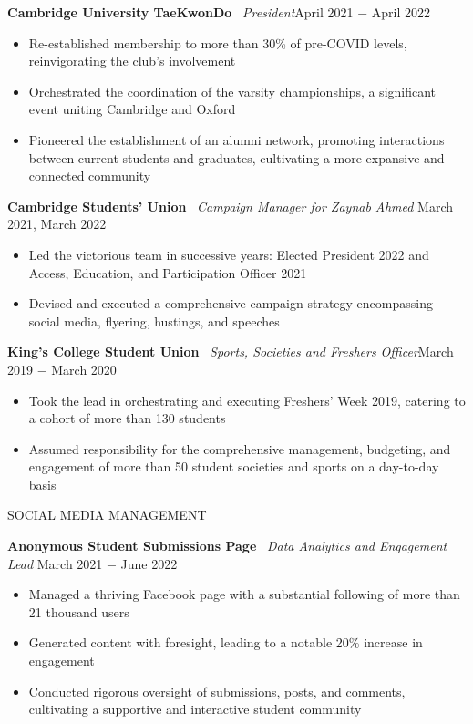 \documentclass{article}
\begin{document}
\textbf{Cambridge University TaeKwonDo} \
\textit{President}\hfill April 2021 $-$ April 2022
\begin{itemize}
    \item Re-established membership to more than 30\% of pre-COVID levels, reinvigorating the club's involvement
    \item Orchestrated the coordination of the varsity championships, a significant event uniting Cambridge and Oxford
    \item Pioneered the establishment of an alumni network, promoting interactions between current students and graduates, cultivating a more expansive and connected community
\end{itemize} \medskip

\textbf{Cambridge Students' Union} \
\textit{Campaign Manager for Zaynab Ahmed} \hfill March 2021, March 2022
\begin{itemize}
    \item Led the victorious team in successive years: Elected President 2022 and Access, Education, and Participation Officer 2021
    \item Devised and executed a comprehensive campaign strategy encompassing social media, flyering, hustings, and speeches
\end{itemize} \medskip

\textbf{King's College Student Union} \
\textit{Sports, Societies and Freshers Officer}\hfill March 2019 $-$ March 2020
\begin{itemize}
    \item Took the lead in orchestrating and executing Freshers' Week 2019, catering to a cohort of more than 130 students
    \item Assumed responsibility for the comprehensive management, budgeting, and engagement of more than 50 student societies and sports on a day-to-day basis
\end{itemize} \medskip

\uppercase{Social Media Management}

\textbf{Anonymous Student Submissions Page} \
\textit{Data Analytics and Engagement Lead} \hfill March 2021 $-$ June 2022
\begin{itemize}
    \item Managed a thriving Facebook page with a substantial following of more than 21 thousand users
    \item Generated content with foresight, leading to a notable 20\% increase in engagement
    \item Conducted rigorous oversight of submissions, posts, and comments, cultivating a supportive and interactive student community
\end{itemize} \medskip
\end{document}
